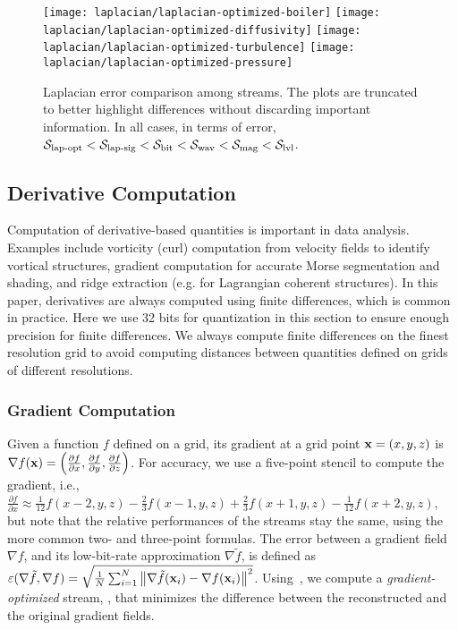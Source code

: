 \begin{figure*}[!t]
\centering
{}
{\texttt{[image: laplacian/laplacian-optimized-boiler]}}
{\texttt{[image: laplacian/laplacian-optimized-diffusivity]}}
{\texttt{[image: laplacian/laplacian-optimized-turbulence]}}
{\texttt{[image: laplacian/laplacian-optimized-pressure]}}
\caption{Laplacian error comparison among streams. The plots are truncated to better highlight
differences without discarding important information. In all cases, in terms of error, $\slop <
\slsg < \sbit < \swav < \smag < \slvl$.}
\label{fig:laplacian-error-comparison}
\end{figure*}

\subsection{Derivative Computation} \label{sec:derivatives}

Computation of derivative-based quantities is important in data analysis. Examples include vorticity
(curl) computation from velocity fields to identify vortical structures, gradient computation for
accurate Morse segmentation and shading, and ridge extraction (e.g. for Lagrangian coherent
structures). In this paper, derivatives are always computed using finite differences, which is
common in practice. Here we use 32 bits for quantization in this section to ensure enough precision for
finite differences. We always compute finite differences on the finest resolution grid to avoid
computing distances between quantities defined on grids of different resolutions.

\subsubsection{Gradient Computation} \label{sec:gradient}

Given a function $f$ defined on a grid, its gradient at a grid point \mbox{$\x = (x,y,z)$} is
$\nabla f(\x) = \left(\frac{\partial f}{\partial x}, \frac{\partial f}{\partial y}, \frac{\partial
f}{\partial z}\right)$. For accuracy, we use a five-point stencil to compute the gradient, i.e.,
$\frac{\partial f}{\partial x} \approx \frac{1}{12}f(x-2,y,z) - \frac{2}{3}f(x-1,y,z) +
\frac{2}{3}f(x+1,y,z) - \frac{1}{12}f(x+2,y,z)$, but note that the relative performances of the
streams stay the same, using the more common two- and three-point formulas. The error between a
gradient field $\nabla f$, and its low-bit-rate approximation $\nabla
\tilde{f}$, is defined as $\err(\nabla \tilde{f}, \nabla f) = \sqrt{\frac{1}{N}
\sum_{i=1}^{N}{\norm{\nabla \tilde{f}(\x_i)-\nabla f(\x_i)}^2}}$. Using~, we
compute a \emph{gradient-optimized} stream, \sgop, that minimizes the difference between the
reconstructed and the original gradient fields.

